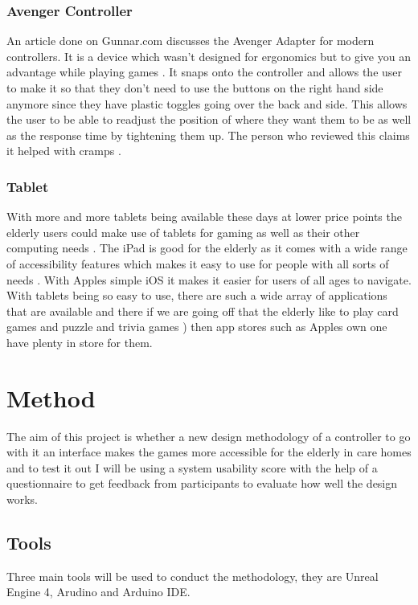 \documentclass[journal]{IEEEtran}
\begin{document}
\subsubsection{Avenger Controller}
An article done on Gunnar.com \cite{noauthor_ergonomics_2012} discusses the Avenger Adapter \cite{noauthor_avenger_nodate} for modern controllers. It is a device which wasn't designed for ergonomics \cite{noauthor_ergonomics_2012} but to give you an advantage while playing games \cite{noauthor_avenger_nodate}. It snaps onto the controller and allows the user to make it so that they don't need to use the buttons on the right hand side anymore since they have plastic toggles going over the back and side. This allows the user to be able to readjust the position of where they want them to be as well as the response time by tightening them up. The person who reviewed this claims it helped with cramps \cite{noauthor_avenger_nodate}.

\subsubsection{Tablet}
With more and more tablets being available these days at lower price points the elderly users could make use of tablets for gaming as well as their other computing needs \cite{noauthor_safest_2014}. The iPad is good for the elderly as it comes with a wide range of accessibility features which makes it easy to use for people with all sorts of needs \cite{noauthor_accessibility_nodate}. With Apples simple iOS \cite{noauthor_3_nodate} it makes it easier for users of all ages to navigate. With tablets being so easy to use, there are such a wide array of applications that are available and there if we are going off that the elderly like to play card games and puzzle and trivia games \cite{noauthor_nearly_nodate}) then app stores such as Apples own one \cite{noauthor_app_nodat} have plenty in store for them.

\section{Method}
The aim of this project is whether a new design methodology of a controller to go with it an interface makes the games more accessible for the elderly in care homes and to test it out I will be using a system usability score with the help of a questionnaire to get feedback from participants to evaluate how well the design works.
\subsection{Tools}
Three main tools will be used to conduct the methodology, they are Unreal Engine 4, Arudino and Arduino IDE.
\end{document}
